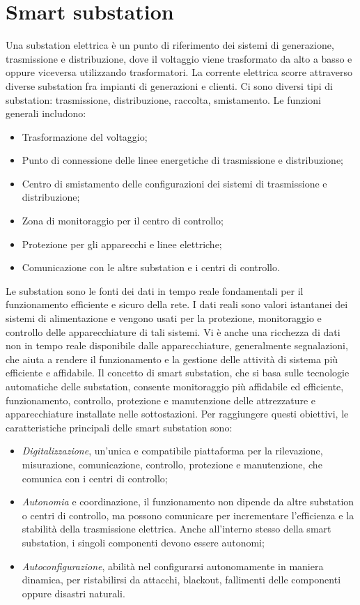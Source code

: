 \section{Smart substation}
Una substation elettrica è un punto di riferimento dei sistemi di generazione, trasmissione e distribuzione, dove il voltaggio viene trasformato da alto a basso e oppure viceversa utilizzando trasformatori. La corrente elettrica scorre attraverso diverse substation fra impianti di generazioni e clienti. Ci sono diversi tipi di substation: trasmissione, distribuzione, raccolta, smistamento. Le funzioni generali includono:
\begin{itemize}
	\item Trasformazione del voltaggio;
	\item Punto di connessione delle linee energetiche di trasmissione e distribuzione;
	\item Centro di smistamento delle configurazioni dei sistemi di trasmissione e distribuzione;
	\item Zona di monitoraggio per il centro di controllo;
	\item Protezione per gli apparecchi e linee elettriche;
	\item Comunicazione con le altre substation e i centri di controllo. 
\end{itemize} 
Le substation sono le fonti dei dati in tempo reale fondamentali per il funzionamento efficiente e sicuro della rete. I dati reali sono valori istantanei dei sistemi di alimentazione e vengono usati per la protezione, monitoraggio e controllo delle apparecchiature di tali sistemi. Vi è anche una ricchezza di dati non in tempo reale disponibile dalle apparecchiature, generalmente segnalazioni, che aiuta a rendere il funzionamento e la gestione delle attività di sistema più efficiente e affidabile.
\newline
Il concetto di smart substation, che si basa sulle tecnologie automatiche delle substation, consente monitoraggio più affidabile ed efficiente, funzionamento, controllo, protezione e manutenzione delle attrezzature e apparecchiature installate nelle sottostazioni. Per raggiungere questi obiettivi, le caratteristiche principali delle smart substation sono:
\begin{itemize}
	\item \emph{Digitalizzazione}, un'unica e compatibile piattaforma per la rilevazione, misurazione, comunicazione, controllo, protezione e manutenzione, che comunica con i centri di controllo;
	\item \emph{Autonomia} e {coordinazione}, il funzionamento non dipende da altre substation o centri di controllo, ma possono comunicare per incrementare l'efficienza e la stabilità della trasmissione elettrica. Anche all'interno stesso della smart substation, i singoli componenti devono essere autonomi;
	\item \emph{Autoconfigurazione}, abilità nel configurarsi autonomamente in maniera dinamica, per ristabilirsi da attacchi, blackout, fallimenti delle componenti oppure disastri naturali.   
\end{itemize}   

